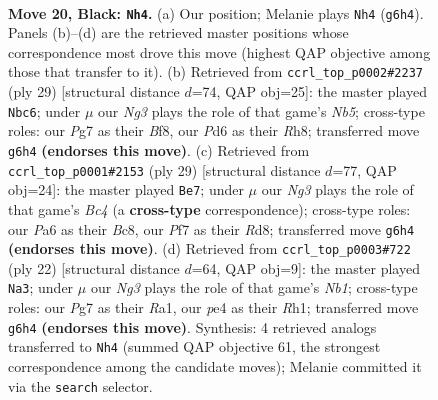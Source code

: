 \documentclass[11pt]{article}
\begin{document}
\clearpage

\begin{figure}[p]\centering
\begin{subfigure}{0.46\textwidth}\centering
\resizebox{\linewidth}{!}{%
\newchessgame
\chessboard[
  setfen={1rr1n1k1/2p1bppp/p2p2n1/N4P1b/2P1P3/PB6/6P1/RNB1R1K1 b - - 0 20},
  showmover=false,
  pgfstyle=straightmove, color=movearrow, markmove={g6-h4}
]}
\caption{}
\end{subfigure}\hfill
\begin{subfigure}{0.46\textwidth}\centering
\resizebox{\linewidth}{!}{%
\newchessgame
\chessboard[
  setfen={r3kb1r/1p2npp1/4p2p/p2pP2P/1n1P4/P6R/1P1NNPP1/R1B2K2 b kq - 0 15},
  showmover=false,
  pgfstyle=straightmove, color=movearrow, markmove={b4-c6}
]}
\caption{}
\end{subfigure}
\\[4pt]
\begin{subfigure}{0.46\textwidth}\centering
\resizebox{\linewidth}{!}{%
\newchessgame
\chessboard[
  setfen={r1br1nk1/1p3ppp/p3pn2/P1b5/1P6/2P1NN2/2B2PPP/R1B1K2R b KQ - 0 15},
  showmover=false,
  pgfstyle=straightmove, color=movearrow, markmove={c5-e7}
]}
\caption{}
\end{subfigure}\hfill
\begin{subfigure}{0.46\textwidth}\centering
\resizebox{\linewidth}{!}{%
\newchessgame
\chessboard[
  setfen={rn2kb1r/pp3pp1/2pp1n2/5b2/3P1N1p/2P2P2/PP2BKPP/RNB4R w kq - 0 12},
  showmover=false,
  pgfstyle=straightmove, color=movearrow, markmove={b1-a3}
]}
\caption{}
\end{subfigure}
\caption{\textbf{Move 20, Black: \texttt{Nh4}.} (a) Our position; Melanie plays \texttt{Nh4} (\texttt{g6h4}). Panels (b)--(d) are the retrieved master positions whose correspondence most drove this move (highest QAP objective among those that transfer to it). (b) Retrieved from \texttt{ccrl\_top\_p0002\#2237} (ply 29) [structural distance $d$=74, QAP obj=25]: the master played \texttt{Nbc6}; under $\mu$ our \emph{Ng3} plays the role of that game's \emph{Nb5}; cross-type roles: our \emph{P}g7 as their \emph{B}f8, our \emph{P}d6 as their \emph{R}h8; transferred move \texttt{g6h4} \textbf{(endorses this move)}. (c) Retrieved from \texttt{ccrl\_top\_p0001\#2153} (ply 29) [structural distance $d$=77, QAP obj=24]: the master played \texttt{Be7}; under $\mu$ our \emph{Ng3} plays the role of that game's \emph{Bc4} (a \textbf{cross-type} correspondence); cross-type roles: our \emph{P}a6 as their \emph{B}c8, our \emph{P}f7 as their \emph{R}d8; transferred move \texttt{g6h4} \textbf{(endorses this move)}. (d) Retrieved from \texttt{ccrl\_top\_p0003\#722} (ply 22) [structural distance $d$=64, QAP obj=9]: the master played \texttt{Na3}; under $\mu$ our \emph{Ng3} plays the role of that game's \emph{Nb1}; cross-type roles: our \emph{P}g7 as their \emph{R}a1, our \emph{p}e4 as their \emph{R}h1; transferred move \texttt{g6h4} \textbf{(endorses this move)}. Synthesis: 4 retrieved analogs transferred to \texttt{Nh4} (summed QAP objective 61, the strongest correspondence among the candidate moves); Melanie committed it via the \texttt{search} selector.}
\label{fig:thought-m39}
\end{figure}
\end{document}
